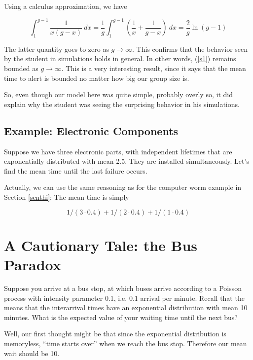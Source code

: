 Using a calculus approximation, we have

\begin{equation}
\int_1^{g-1} \frac{1}{x(g-x)} ~ dx = \frac{1}{g} \int_1^{g-1}
(\frac{1}{x} +
\frac{1}{g-x}) ~ dx = \frac{2}{g} \ln(g-1)
\end{equation}

The latter quantity goes to zero as $g \rightarrow \infty$.  This
confirms that the behavior seen by the student in simulations holds in
general.  In other words, (\ref{s1}) remains bounded as $g \rightarrow
\infty$.  This is a very interesting result, since it says that the mean
time to alert is bounded no matter how big our group size is.

So, even though our model here was quite simple, probably overly so, it
did explain why the student was seeing the surprising behavior in his
simulations.

\subsection{Example:  Electronic Components}

Suppose we have three electronic parts, with independent lifetimes that
are exponentially distributed with mean 2.5.  They are installed
simultaneously.  Let's find the mean time until the last failure occurs.

Actually, we can use the same reasoning as for the computer worm example
in Section \ref{senthi}:  The mean time is simply

\begin{equation}
1/(3 \cdot 0.4) + 1/(2 \cdot 0.4) + 1/(1 \cdot 0.4)
\end{equation}

\section{A Cautionary Tale:  the Bus Paradox}
\label{busparadox}

Suppose you arrive at a bus stop, at which buses arrive according to a
Poisson process with intensity parameter 0.1, i.e. 0.1 arrival per
minute.  Recall that the means that the interarrival times have an
exponential distribution with mean 10 minutes. What is the expected
value of your waiting time until the next bus?

Well, our first thought might be that since the exponential distribution
is memoryless, ``time starts over'' when we reach the bus stop.
Therefore our mean wait should be 10.

